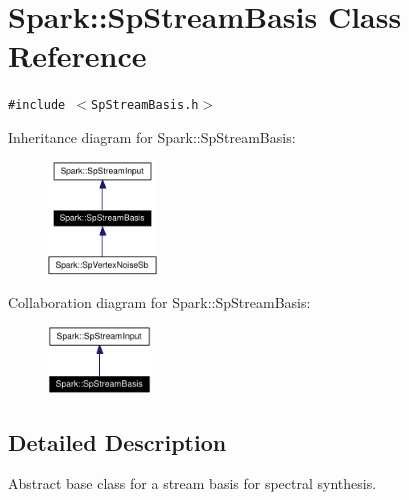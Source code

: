 \section{Spark::Sp\-Stream\-Basis Class Reference}
\label{classSpark_1_1SpStreamBasis}
{\tt \#include $<$Sp\-Stream\-Basis.h$>$}

Inheritance diagram for Spark::Sp\-Stream\-Basis:\begin{figure}[H]
\begin{center}
\leavevmode
\includegraphics[width=82pt]{classSpark_1_1SpStreamBasis__inherit__graph}
\end{center}
\end{figure}
Collaboration diagram for Spark::Sp\-Stream\-Basis:\begin{figure}[H]
\begin{center}
\leavevmode
\includegraphics[width=77pt]{classSpark_1_1SpStreamBasis__coll__graph}
\end{center}
\end{figure}


\subsection{Detailed Description}
Abstract base class for a stream basis for spectral synthesis. 

